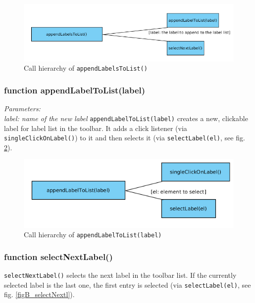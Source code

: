 \begin{figure}[H]
	\begin{center}
		\includegraphics[scale=0.5]{img/ch_appendLabels.png}
		\caption{Call hierarchy of \texttt{appendLabelsToList()}}
		\label{figB_appendLabels}
	\end{center}
\end{figure}


\subsubsection{function appendLabelToList(label)}
\emph{Parameters:\\
	label: name of the new label
}
\texttt{appendLabelToList(label)} creates a new, clickable label for label list in the toolbar. It adds a click listener (via \texttt{singleClickOnLabel()}) to it and then selects it (via \texttt{selectLabel(el)}, see fig. \ref{figB_appendLabel}).

\begin{figure}[H]
	\begin{center}
		\includegraphics[scale=0.5]{img/ch_appendLabel.png}
		\caption{Call hierarchy of \texttt{appendLabelToList(label)}}
		\label{figB_appendLabel}
	\end{center}
\end{figure}


\subsubsection{function selectNextLabel()}
\texttt{selectNextLabel()} selects the next label in the toolbar list. If the currently selected label is the last one, the first entry is selected (via \texttt{selectLabel(el)}, see fig. \ref{figB_selectNextl}).

